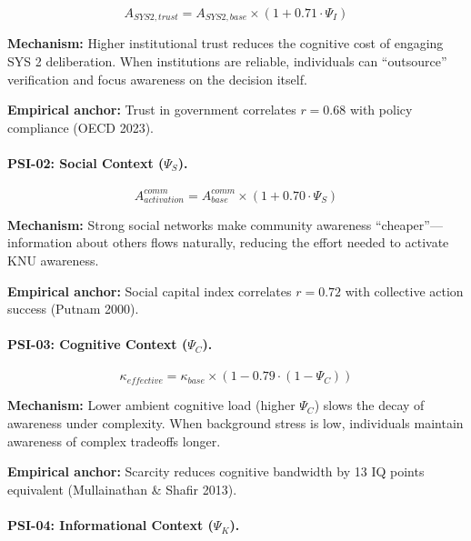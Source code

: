 \begin{equation}
A_{SYS2,trust} = A_{SYS2,base} \times (1 + 0.71 \cdot \Psi_I)
\end{equation}

\textbf{Mechanism:} Higher institutional trust reduces the cognitive cost of engaging SYS 2 deliberation. When institutions are reliable, individuals can ``outsource'' verification and focus awareness on the decision itself.

\textbf{Empirical anchor:} Trust in government correlates $r = 0.68$ with policy compliance (OECD 2023).

\paragraph{PSI-02: Social Context ($\Psi_S$).}

\begin{equation}
A^{comm}_{activation} = A^{comm}_{base} \times (1 + 0.70 \cdot \Psi_S)
\end{equation}

\textbf{Mechanism:} Strong social networks make community awareness ``cheaper''---information about others flows naturally, reducing the effort needed to activate KNU awareness.

\textbf{Empirical anchor:} Social capital index correlates $r = 0.72$ with collective action success (Putnam 2000).

\paragraph{PSI-03: Cognitive Context ($\Psi_C$).}

\begin{equation}
\kappa_{effective} = \kappa_{base} \times (1 - 0.79 \cdot (1 - \Psi_C))
\end{equation}

\textbf{Mechanism:} Lower ambient cognitive load (higher $\Psi_C$) slows the decay of awareness under complexity. When background stress is low, individuals maintain awareness of complex tradeoffs longer.

\textbf{Empirical anchor:} Scarcity reduces cognitive bandwidth by 13 IQ points equivalent (Mullainathan \& Shafir 2013).

\paragraph{PSI-04: Informational Context ($\Psi_K$).}

